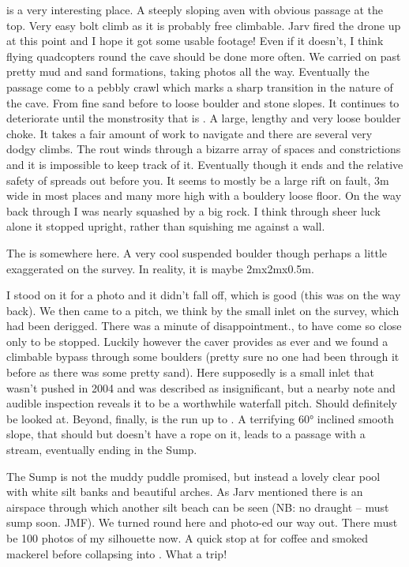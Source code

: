  is a very interesting place. A steeply sloping aven with obvious passage at the top. Very easy bolt climb as it is probably free climbable. Jarv fired the drone up at this point and I hope it got some usable footage! Even if it doesn't,  I think flying quadcopters round the cave should be done more often.
We carried on past pretty mud  and sand formations, taking photos all the way. Eventually the passage come to a pebbly crawl which marks a sharp transition in the nature of the cave.  From fine sand before to loose boulder and stone slopes. It continues to deteriorate until the monstrosity that is . A large, lengthy and very loose boulder choke. 
It takes a fair amount of work to navigate and there are several very dodgy climbs. The rout winds through a bizarre array of spaces and constrictions and it is impossible to keep track of it.
Eventually though it ends and the relative safety of  spreads out before you. It seems to mostly be a large rift on fault, 3m wide in most places and many more high with a bouldery loose floor. On the way back through I was nearly squashed by a big rock. I think through sheer luck alone it stopped upright, rather than squishing me against a wall. 

The  is somewhere here. A very cool suspended boulder though perhaps a little exaggerated on the survey. In reality, it is maybe 2mx2mx0.5m.

I stood on it for a photo and it didn't fall off, which is good (this was on the way back).
We then came to  a pitch, we think by the small inlet on the survey, which had been derigged. There was a minute of disappointment., to have come so close only to be stopped. Luckily however the caver provides as ever and we found a climbable bypass through some boulders (pretty sure no one had been through it before as there was some pretty sand).
Here supposedly is a small inlet that wasn't pushed in 2004 and was described as insignificant, but a nearby note and audible inspection reveals it to be a worthwhile waterfall pitch. Should definitely be looked at.
Beyond, finally, is the run up to . A terrifying 60° inclined smooth slope, that should but doesn't have a rope on it,  leads to a passage with a stream, eventually ending in the Sump. 

The Sump is not the muddy puddle promised, but instead a lovely clear pool with white silt banks and beautiful arches. As Jarv mentioned there is an airspace through which another silt beach can be seen (NB: no draught – must sump soon. JMF). 
We turned round here and photo-ed our way out. There must be 100 photos of my silhouette now. A quick stop at  for coffee and smoked mackerel before collapsing into . 
What a trip!

\begin{figure}[t!]
\checkoddpage \ifoddpage \forcerectofloat \else \forceversofloat \fi

\end{figure}
